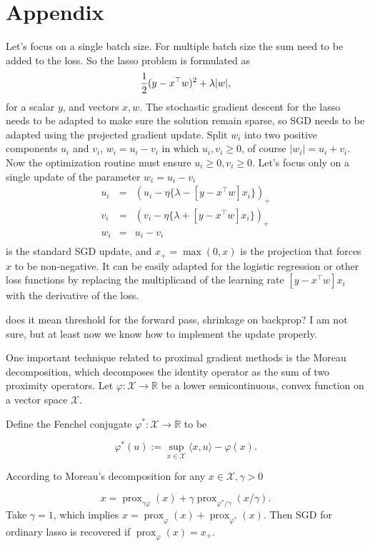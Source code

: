\documentclass{article}
\def \vahid {\color{magenta}}
\begin{document}
\section*{Appendix}
Let's focus on a single batch size. For multiple batch size the sum need to be added to the loss. So the lasso problem is formulated as 
$${1\over 2} (y-x^\top w )^2 +\lambda |w|,$$
for a scalar $y$, and vectors $x,w$.
The stochastic gradient descent for the lasso needs to be adapted to make sure the solution remain sparse, so SGD needs to be adapted using the projected gradient update. Split $w_i$ into two positive components $u_i$ and $v_i$, $w_i= u_i-v_i$ in which $u_i,v_i\geq 0$, of course $|w_i| = u_i+v_i$. Now the optimization routine must ensure $u_i\geq 0, v_i\geq 0$.
Let's focus only on a single update of the parameter $w_i = u_i-v_i$
\begin{eqnarray*}
u_i &=& (u_i - \eta   \{\lambda - [y - x^\top w]  x_i\} )_+\\
v_i &=& (v_i - \eta \{\lambda + [y - x^\top w]  x_i\} )_+\\
w_i &=& u_i -v_i\\
\end{eqnarray*}
is the standard SGD update, and $x_+=\max(0,x)$ is the projection that forces $x$ to be non-negative. It can be easily adapted for the logistic regression or other loss functions by replacing the multiplicand of the learning rate $[y - x^\top w]  x_i$ with the derivative of the loss.


{\vahid does it mean threshold for the forward pass, shrinkage on backprop? I am not sure, but at least now we know how to implement the  update properly.}



One important technique related to proximal gradient methods is the Moreau decomposition, which decomposes the identity operator as the sum of two proximity operators.
Let $ \varphi :\mathcal {X}\to \mathbb {R}$ be a lower semicontinuous, convex function on a vector space $\mathcal X$. 

Define the Fenchel conjugate $\varphi ^{*}:{\mathcal {X}}\to \mathbb {R}$ to be 

$$  \varphi ^{*}(u):=\sup _{x\in {\mathcal {X}}}\langle x,u\rangle -\varphi (x).$$ 

According to Moreau's decomposition for any $ x\in \mathcal X, \gamma>0$ 

$$ x=\operatorname {prox} _{\gamma \varphi }(x)+\gamma \operatorname {prox} _{\varphi ^{*}/\gamma }(x/\gamma ).$$ 
Take $\gamma=1$, which implies $ x = \operatorname{prox}_{\varphi}(x)+\operatorname{prox}_{\varphi^*}(x). $  Then SGD for ordinary lasso is recovered if $\operatorname{prox}_{\varphi}(x) = x_+ .$
\end{document}
